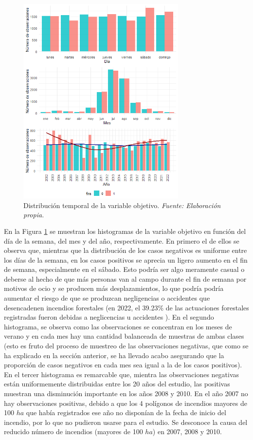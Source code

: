 \documentclass[12pt,a4paper,]{book}
\numberwithin{dummy}{section}
\theoremstyle{ocrenumbox}
\theoremstyle{blacknumex}
\theoremstyle{blacknumbox}
\theoremstyle{ocrenum}
\theoremstyle{ocrenum}
\begin{document}
\begin{figure}[htb]
\centering
\includegraphics[width = 0.75\textwidth]{graficos/distribucion_temporal_fire.png}
\caption[Distribución temporal de la variable objetivo]{Distribución temporal de la variable objetivo. \it Fuente: Elaboración propia.}
\label{fig:dist_temp_fire}
\end{figure}

En la Figura \ref{fig:dist_temp_fire} se muestran los histogramas de la
variable objetivo en función del día de la semana, del mes y del año,
respectivamente. En primero el de ellos se observa que, mientras que la
distribución de los casos negativos es uniforme entre los días de la
semana, en los casos positivos se aprecia un ligero aumento en el fin de
semana, especialmente en el sábado. Esto podría ser algo meramente
casual o deberse al hecho de que más personas van al campo durante el
fin de semana por motivos de ocio y se producen más desplazamientos, lo
que podría podría aumentar el riesgo de que se produzcan negligencias o
accidentes que desencadenen incendios forestales (en 2022, el 39.23\% de
las actuaciones forestales registradas fueron debidas a neglicencias u
accidentes \citep{INFOCA2022}). En el segundo histograma, se observa
como las observaciones se concentran en los meses de verano y en cada
mes hay una cantidad balanceada de muestras de ambas clases (esto es
fruto del proceso de muestreo de las observaciones negativas, que como
se ha explicado en la sección anterior, se ha llevado acabo asegurando
que la proporción de casos negativos en cada mes sea igual a la de los
casos positivos). En el tercer histograma es remarcable que, mientra las
observaciones negativas están uniformemente distribuidas entre los 20
años del estudio, las positivas muestran una disminución importante en
los años 2008 y 2010. En el año 2007 no hay observaciones positivas,
debido a que los 4 polígonos de incendios mayores de 100 \(ha\) que
había registrados ese año no disponían de la fecha de inicio del
incendio, por lo que no pudieron usarse para el estudio. Se desconoce la
causa del reducido número de incendios (mayores de 100 \(ha\)) en 2007,
2008 y 2010.
\end{document}
